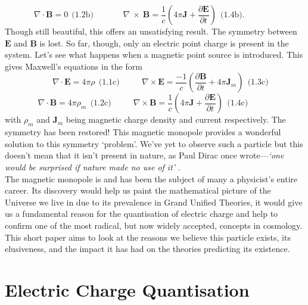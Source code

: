 \documentclass[twocolumn, 10pt]{article}
\begin{document}
\begin{equation*}
\ \ \nabla \cdotp \mathbf{B} = 0   \ \ \text{(1.2b)} \ \ \ \ \ \ \ \ \ \ \ \ \ \ \ \ \nabla \ \times \ \mathbf{B} = \frac{1}{c}\left(4\pi\mathbf{J} + \frac{\partial \mathbf{E}}{\partial t}\right) \ \ \text{(1.4b)}\text{.} \ \ \ \ \ \ \ \ \ \ \ \ \ \ \ \ \ \ \      
\end{equation*}
Though still beautiful, this offers an unsatisfying result. The symmetry between $\mathbf{E}$ and $\mathbf{B}$ is lost. So far, though, only an electric point charge is present in the system. Let's see what happens when a magnetic point source is introduced. This gives Maxwell's equations in the form \cite{ellismagnetic}
\begin{equation*}
\ \ \ \ \ \ \nabla \cdotp \mathbf{E} = 4\pi\rho  \ \ \text{(1.1c)}  \ \ \ \ \ \ \ \ \ \ \ \   \nabla \times \mathbf{E} = \frac{-1}{c}\left(\frac{\partial \mathbf{B}}{\partial t} + 4\pi\mathbf{J}_{m}\right) \ \  \text{(1.3c)}
\end{equation*}
\begin{equation*}
\ \ \ \ \ \ \nabla \cdotp \mathbf{B} = 4\pi\rho_{m}  \ \ \text{(1.2c)} \ \ \ \ \ \ \ \ \ \ \ \ \nabla \times \mathbf{B} = \frac{1}{c}\left(4\pi\mathbf{J} + \frac{\partial \mathbf{E}}{\partial t}\right) \ \ \text{(1.4c)} \ \ \ \ \ \ \ \ \ \ \ \ \ \ \ \ \ \ \      
\end{equation*}
with $\rho_{m}$ and $\mathbf{J}_{m}$ being magnetic charge density and current respectively. The symmetry has been restored! This magnetic monopole provides a wonderful solution to this symmetry `problem'. We've yet to observe such a particle but this doesn't mean that it isn't present in nature, as Paul Dirac once wrote---\textit{`one would be surprised if nature made no use of it'} \cite{dirac1931quantised}. \\
\indent The magnetic monopole is and has been the subject of many a physicist's entire career. Its discovery would help us paint the mathematical picture of the Universe we live in due to its prevalence in Grand Unified Theories, it would give us a fundamental reason for the quantisation of electric charge and help to confirm one of the most radical, but now widely accepted, concepts in cosmology. This short paper aims to look at the reasons we believe this particle exists, its elusiveness, and the impact it has had on the theories predicting its existence. 

\section{Electric Charge Quantisation}
\end{document}
